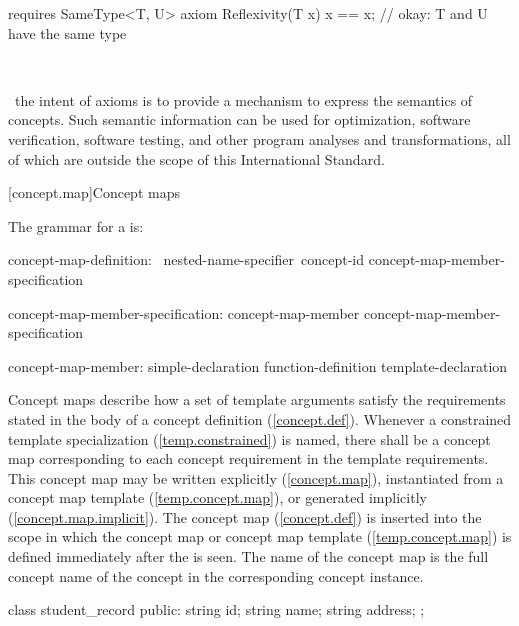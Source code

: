 \documentclass[american]{book}
\begin{document}
\begin{paras}
\begin{codeblock}
{  requires SameType<T, U> axiom Reflexivity(T x) {
      x == x; // okay: T and U have the same type
    }
}
\end{codeblock}
\exitexample\

\pnum
{}
\enternote\
the intent of axioms is to provide a mechanism to express
the semantics of concepts. Such semantic information can be used for
optimization, software verification, software testing, and other
program analyses and transformations, all of which are outside the
scope of this International Standard.
\exitnote\


[concept.map]{Concept maps}

\pnum
The grammar for a  is:

\begin{bnf}
%
concept-map-definition:\br
          \terminal{::}\opt\ nested-name-specifier\opt\ concept-id \terminal{\{} concept-map-member-specification\opt\ \terminal{\}} \terminal{;}\opt\ \br

concept-map-member-specification:\br
         concept-map-member concept-map-member-specification\opt\ \br

concept-map-member:\br
         simple-declaration \br
         function-definition \br
         template-declaration
\end{bnf}

\pnum
Concept maps describe how a set of template arguments satisfy the
requirements stated in the body of a concept definition
(\ref{concept.def}). Whenever a constrained template specialization
(\ref{temp.constrained}) is named, there shall be a concept map
corresponding to each concept requirement in the
template requirements. This concept map may be written
explicitly (\ref{concept.map}), instantiated from a concept map
template (\ref{temp.concept.map}), or generated implicitly
(\mbox{\ref{concept.map.implicit}}).
%
The concept map (\ref{concept.def}) is inserted into the scope in
which the concept map or concept map template (\ref{temp.concept.map})
is defined immediately after the \techterm{concept-id} is seen. The
name of the concept map is the full concept name of the concept in the
corresponding concept instance.
%
\enterexample\
\begin{codeblock}
class student_record { 
public: 
  string id; 
  string name; 
  string address; 
}; 


\end{codeblock}
\end{paras}
\end{document}
